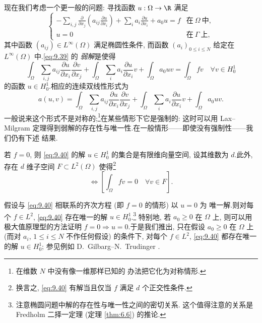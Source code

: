 \begin{example}[一般二阶椭圆方程]
现在我们考虑一个更一般的问题: 寻找函数 $u:\Omega\to\R$ 满足
\begin{equation}
\begin{cases}
\displaystyle-\sum_{i,j}\frac{\partial}{\partial x_j}
\left(a_{ij}\frac{\partial u}{\partial x_i}\right)
+\sum_ia_i\frac{\partial u}{\partial x_i}+a_0u=f
& \text{在}\ \Omega\ \text{中},\\[2mm]
u=0 & \text{在}\ \Gamma\ \text{上},
\end{cases}
\label{eq:9.39}
\end{equation}
其中函数 $(a_{ij})\in L^\infty(\Omega)$ 满足椭圆性条件, 而函数
$(a_i)_{0\le i\le N}$ 给定在 $L^\infty(\Omega)$ 中.\eqref{eq:9.39} 的
\emph{弱解}是使得
\begin{equation}
\int_\Omega\sum_{i,j}a_{ij}\frac{\partial u}{\partial x_i}
\frac{\partial v}{\partial x_j}+\int_\Omega\sum_ia_i
\frac{\partial u}{\partial x_i}v+\int_\Omega a_0uv=\int_\Omega fv
\quad\forall v\in H_0^1
\label{eq:9.40}
\end{equation}
的函数 $u\in H_0^1$.相应的连续双线性形式为
\begin{equation}
a(u,v)=\int_\Omega\sum_{i,j}a_{ij}\frac{\partial u}{\partial x_i}
\frac{\partial v}{\partial x_j}+\int_\Omega\sum_ia_i
\frac{\partial u}{\partial x_i}v+\int_\Omega a_0uv.
\label{eq:9.41}
\end{equation}
一般说来这个形式不是对称的;\footnote{在维数 $N$ 中没有像一维那样已知的
办法把它化为对称情形.}在某些情形下它是强制的: 这时可以用 Lax--Milgram
定理得到弱解的存在性与唯一性.在一般情形——即使没有强制性——我们仍有下述
结果.
\end{example}

\begin{theorem}
\label{thm:9.23}
若 $f=0$, 则 \eqref{eq:9.40} 的解 $u\in H_0^1$ 的集合是有限维向量空间,
设其维数为 $d$.此外, 存在 $d$ 维子空间 $F\subset L^2(\Omega)$ 使得\footnote{
换言之, \eqref{eq:9.40} 有解当且仅当 $f$ 满足 $d$ 个正交性条件.}
\begin{equation*}
[\eqref{eq:9.40}\ \text{有解}]
\iff\left[\int_\Omega fv=0\quad\forall v\in F\right].
\end{equation*}
\end{theorem}

\begin{remark}
\label{rem:9.23}
假设与 \eqref{eq:9.40} 相联系的齐次方程 (即 $f=0$ 的情形) 以 $u=0$ 为
唯一解.则对每个 $f\in L^2$, \eqref{eq:9.40} 存在唯一的解
$u\in H_0^1$.\footnote{注意椭圆问题中解的存在性与唯一性之间的密切关系.
这个值得注意的关系是 Fredholm 二择一定理 (定理  \ref{thm:6.6}) 的推论.}
特别地, 若 $a_0\ge0$ 在 $\Omega$ 上, 则可以用极大值原理型的方法证明
$f=0\Rightarrow u=0$.于是我们推出, 只在假设 $a_0\ge0$ 在 $\Omega$ 上
(而对 $a_i$, $1\le i\le N$ 不作任何假设) 的条件下, 对每个 $f\in L^2$,
\eqref{eq:9.40} 都存在唯一的解 $u\in H_0^1$; 参见例如
D.~Gilbarg--N.~Trudinger .
\end{remark}

